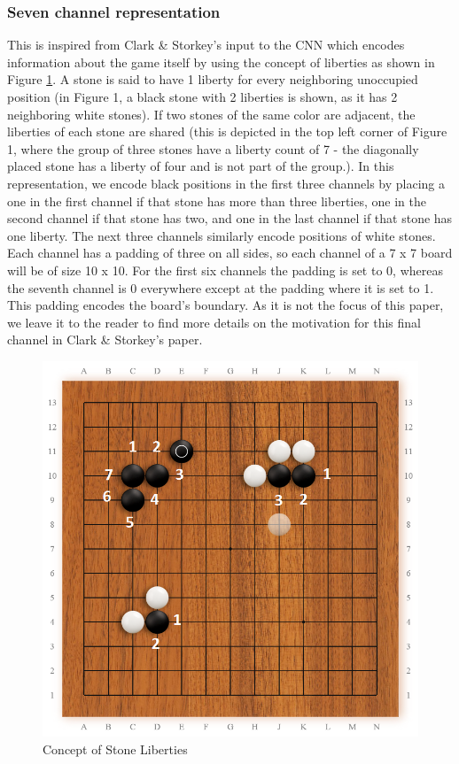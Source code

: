 \subsubsection{Seven channel representation} This is inspired from Clark \& Storkey's input to the CNN which encodes information about the game itself by using the concept of liberties as shown in Figure \ref{fig:liberties}. A stone is said to have 1 liberty for every neighboring unoccupied position (in Figure 1, a black stone with 2 liberties is shown, as it has 2 neighboring white stones). If two stones of the same color are adjacent, the liberties of each stone are shared (this is depicted in the top left corner of Figure 1, where the group of three stones have a liberty count of 7 - the diagonally placed stone has a liberty of four and is not part of the group.). In this representation, we encode black positions in the first three channels by placing a one in the first channel if that stone has more than three liberties, one in the second channel if that stone has two, and one in the last channel if that stone has one liberty. The next three channels similarly encode positions of white stones. Each channel has a padding of three on all sides, so each channel of a 7 x 7 board will be of size 10 x 10. For the first six channels the padding is set to 0, whereas the seventh channel is 0 everywhere except at the padding where it is set to 1. This padding encodes the board's boundary. As it is not the focus of this paper, we leave it to the reader to find more details on the motivation for this final channel in Clark \& Storkey's paper.
\begin{figure}[h]
	\centering
	\includegraphics[scale=0.25]{ExampleLiberties}
	\caption{Concept of Stone Liberties}
\label{fig:liberties}
\end{figure}
\\

